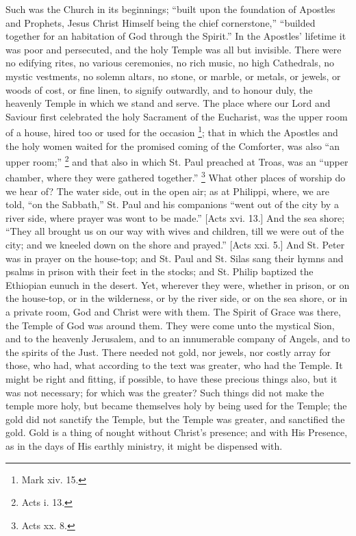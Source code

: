 Such was the Church in its beginnings; ``built upon the
foundation of Apostles and Prophets, Jesus Christ Himself being the
chief cornerstone,'' ``builded together for an habitation of
God through the Spirit.'' In the Apostles' lifetime it was poor
and persecuted, and the holy Temple was all but invisible. There were
no edifying rites, no various ceremonies, no rich music, no high
Cathedrals, no mystic vestments, no solemn altars, no stone, or
marble, or metals, or jewels, or woods of cost, or fine linen, to
signify outwardly, and to honour duly, the heavenly Temple in which we
stand and serve. The place where our Lord and Saviour first celebrated
the holy Sacrament of the Eucharist, was the upper room of a house,
hired too or used for the occasion \footnote{Mark xiv. 15.}; that in which the Apostles and the holy women waited for the
promised coming of the Comforter, was also ``an upper room;''
\footnote{Acts i. 13.} and that also in which
St. Paul preached at Troas, was an ``upper chamber, where they
were gathered together.'' \footnote{Acts xx. 8.}
What other places of worship do we hear of? The water side, out in the
open air; as at Philippi, where, we are told, ``on the
Sabbath,'' St. Paul and his companions ``went out of the city
by a river side, where prayer was wont to be made.'' [Acts xvi.
13.] And the sea shore; ``They all brought us on our way with
wives and children, till we were out of the city; and we kneeled down
on the shore and prayed.'' [Acts xxi. 5.] And St. Peter was in
prayer on the house-top; and St. Paul and St. Silas sang their hymns
and psalms in prison with their feet in the stocks; and St. Philip
baptized the Ethiopian eunuch in the desert. Yet, wherever they were,
whether in prison, or on the house-top, or in the wilderness, or by
the river side, or on the sea shore, or in a private room, God and
Christ were with them. The Spirit of Grace was there, the Temple of
God was around them. They were come unto the mystical Sion, and to the
heavenly Jerusalem, and to an innumerable company of Angels, and to
the spirits of the Just. There needed not gold, nor jewels, nor costly
array for those, who had, what according to the text was greater, who
had the Temple. It might be right and fitting, if possible, to have
these precious things also, but it was not necessary; for which was
the greater? Such things did not make the temple more holy, but became
themselves holy by being used for the Temple; the gold did not
sanctify the Temple, but the Temple was greater, and sanctified the
gold. Gold is a thing of nought without Christ's presence; and with
His Presence, as in the days of His earthly ministry, it might be
dispensed with.

